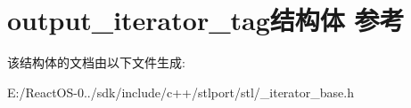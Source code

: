 \hypertarget{structoutput__iterator__tag}{}\section{output\+\_\+iterator\+\_\+tag结构体 参考}
\label{structoutput__iterator__tag}


该结构体的文档由以下文件生成\+:\begin{DoxyCompactItemize}
\item 
E\+:/\+React\+O\+S-\/0../sdk/include/c++/stlport/stl/\+\_\+iterator\+\_\+base.\+h\end{DoxyCompactItemize}

